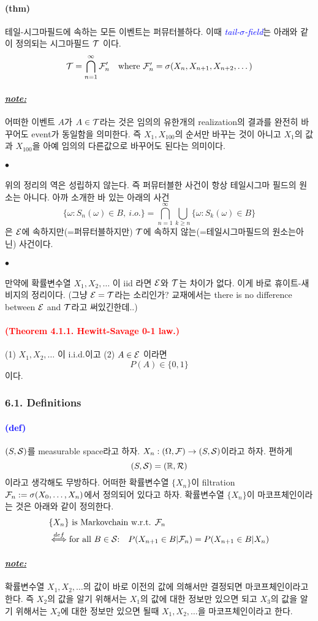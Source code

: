 \documentclass[12pt,oneside,english]{book}
\def\ck{\paragraph{\Large$\bullet$}\Large}
\def\note{\paragraph{\Large\textit{\underline{note:}}}\Large}
\newcommand{\para}[1]{\paragraph{\Large(#1)}\Large}
\newcommand{\parablue}[1]{\paragraph{\Large\textcolor{blue}{(#1)}}\Large}
\newcommand{\parared}[1]{\paragraph{\Large\textcolor{red}{(#1)}}\Large}
\begin{document}
\para{thm} 테일-시그마필드에 속하는 모든 이벤트는 퍼뮤터블하다. 이때 \textcolor{blue}{\emph{tail-$\sigma$-field}}는 아래와 같이 정의되는 시그마필드 ${\cal T}$ 이다. 
\[
{\cal T}=\bigcap_{n=1}^{\infty}{\cal F}'_n \quad \mbox{where ${\cal F}'_n=\sigma(X_n,X_{n+1},X_{n+2},\dots)$}
\]

\note 어떠한 이벤트 $A$가 $A\in{\cal T}$라는 것은 임의의 유한개의 realization의 결과를 완전히 바꾸어도 event가 동일함을 의미한다. 즉 $X_1,X_{100}$의 순서만 바꾸는 것이 아니고 $X_1$의 값과 $X_{100}$을 아예 임의의 다른값으로 바꾸어도 된다는 의미이다. 

\ck 위의 정리의 역은 성립하지 않는다. 즉 퍼뮤터블한 사건이 항상 테일시그마 필드의 원소는 아니다. 아까 소개한 바 있는 아래의 사건
\[
\{\omega:S_n(\omega) \in B, ~i.o.\}=\bigcap_{n=1}^{\infty}\bigcup_{k\geq n}\{\omega: S_k(\omega)\in B\}
\]
은 ${\cal E}$에 속하지만(=퍼뮤터블하지만) ${\cal T}$에 속하지 않는(=테일시그마필드의 원소는아닌) 사건이다. 

\ck 만약에 확률변수열 $X_1,X_2,\dots$ 이 iid 라면 ${\cal E}$와 ${\cal T}$는 차이가 없다. 이게 바로 휴이트-새비지의 정리이다. (그냥 ${\cal E}={\cal T}$라는 소리인가? 교재에서는 there is no difference between ${\cal E}$ and ${\cal T}$라고 써있긴한데..)

\parared{Theorem 4.1.1. Hewitt-Savage 0-1 law.} 
(1) $X_1,X_2,\dots$ 이 i.i.d.이고 (2) $A \in {\cal E}$ 이라면 
\[
P(A) \in \{0,1\}
\]
이다. 



\subsubsection{6.1. Definitions}
\parablue{def} $(S,{\cal S})$를 measurable space라고 하자. $X_n:(\Omega,{\cal F}) \to (S,{\cal S})$이라고 하자. 편하게 
\[
(S,{\cal S})=(\mathbb{R},{\cal R})
\]
이라고 생각해도 무방하다. 어떠한 확률변수열 $\{X_n\}$이 filtration ${\cal F}_n:=\sigma(X_0,\dots,X_n)$에서 정의되어 있다고 하자. 확률변수열 $\{X_n\}$이 마코프체인이라는 것은 아래와 같이 정의한다. 
\begin{align*}
& \{X_n\} \mbox{ is Markovchain w.r.t. } {\cal F}_n \\
& \overset{def}{\Longleftrightarrow} \mbox{for all $B\in {\cal S}$:}\quad 
P(X_{n+1}\in B | {\cal F}_n)=P(X_{n+1}\in B | X_n)
\end{align*}

\note 확률변수열 $X_1,X_2,\dots$의 값이 바로 이전의 값에 의해서만 결정되면 마코프체인이라고 한다. 즉 $X_2$의 값을 알기 위해서는 $X_1$의 값에 대한 정보만 있으면 되고 $X_3$의 값을 알기 위해서는 $X_2$에 대한 정보만 있으면 될때 $X_1,X_2,\dots$을 마코프체인이라고 한다. 
\end{document}
